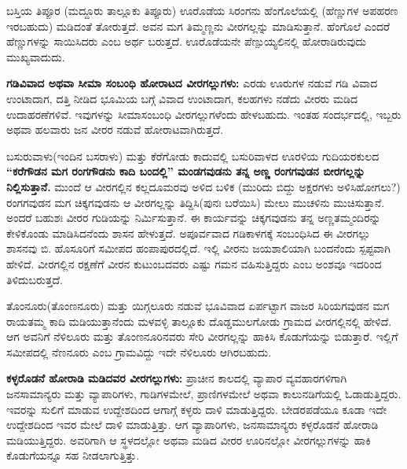 ಬಸ್ತಿಯ ತಿಪ್ಪೂರ (ಮದ್ದೂರು ತಾಲ್ಲೂಕು ತಿಪ್ಪೂರು) ಊರೊಡೆಯ ಸಿರಂಗನು ಹೆಂಗೊಲೆಯಲ್ಲಿ (ಹೆಣ್ಣುಗಳ ಅಪಹರಣ ಇರಬಹುದು) ಮಡಿದಂತೆ ತೋರುತ್ತದೆ. ಅವನ ಮಗ ತಿಮ್ಮಣ್ಣನು ವೀರಗಲ್ಲನ್ನು ಮಾಡಿಸುತ್ತಾನೆ. ಹೆಂಗೊಲೆ ಎಂದರೆ ಹೆಣ್ಣುಗಳನ್ನು ಸಾಯಿಸಿದರು ಎಂಬ ಅರ್ಥ ಬರುತ್ತದೆ. ಊರೊಡೆಯನೇ ಪೆಣ್ಪುಯ್ಯಲಿನಲ್ಲಿ ಹೋರಾಡಿರುವುದು ಮುಖ್ಯವಾದುದು.

\textbf{ಗಡಿವಿವಾದ ಅಥವಾ ಸೀಮಾ ಸಂಬಂಧಿ ಹೋರಾಟದ ವೀರಗಲ್ಲುಗಳು: }ಎರಡು ಊರುಗಳ ನಡುವೆ ಗಡಿ ವಿವಾದ ಉಂಟಾದಾಗ, ದತ್ತಿ ನೀಡಿದ ಭೂಮಿಯ ಬಗ್ಗೆ ವಿವಾದ ಉಂಟಾದಾಗ, ಕಲಹಗಳು ನಡೆದು ವೀರರು ಮಡಿದ ಉದಾಹರಣೆಗಳಿವೆ. ಇವುಗಳನ್ನು ಸೀಮಾಸಂಬಂಧಿ ವೀರಗಲ್ಲುಗಳೆಂದು ಹೇಳಬಹುದು. ಇಂತಹ ಸಂದರ್ಭದಲ್ಲಿ, ಇಬ್ಬರು ಅಥವಾ ಹಲವಾರು ಜನ ವೀರರ ನಡುವೆ ಹೋರಾಟವಾಗಿರುತ್ತದೆ.

ಬಸುರುವಾಳು(ಇಂದಿನ ಬಸರಾಳು) ಮತ್ತು ಕೆರೆಗೋಡು ಕಾದುವಲ್ಲಿ ಬಸುರಿವಾಳದ ಊರಳಿಯ ಗುದಿಯರಕುಲದ \textbf{“ಕರೆಗೌಡನ ಮಗ ರಂಗಗೌಡನು ಕಾದಿ ಬಂದಲ್ಲಿ” ಮಂಡಗವುಡನು ತನ್ನ ಅಣ್ಣ ರಂಗಗವುಡನ ಬೀರಗಲ್ಲನ್ನು ನಿಲ್ಲಿಸುತ್ತಾನೆ.} ಮುಂದೆ ಆ ವೀರಗಲ್ಲಿನ ಕಲ್ಲದೂಮರವು ಅಳಿದ ಬಳಿಕ (ಮುರಿದು ಬಿದ್ದು ಅಕ್ಷರಗಳು ಅಳಿಸಿಹೋಗಲು?) ರಂಗಗವುಡನ ಮಗ ಚಿಕ್ಕಗವುಡನು ಆ ವೀರಗಲ್ಲನ್ನು ತಿದ್ದಿಸಿ(ಪುನಃ ಬರೆಯಿಸಿ) ಮೇಲು ಮುಚಳಿನು ಮುಚಿಸುತ್ತಾನೆ. ಅಂದರೆ ಬಹುಶಃ ವೀರರ ಗುಡಿಯನ್ನು ನಿರ್ಮಿಸುತ್ತಾನೆ. ಈ ಕಾರ್ಯವನ್ನು ಚಿಕ್ಕಗವುಡನು ತನ್ನ ಅಣ್ಣತಮ್ಮಂದಿರನ್ನು ಕೇಳಿಕೊಂಡು ಮಾಡಿಸಿದನೆಂದು ಶಾಸನ ಹೇಳುತ್ತದೆ. ಅಪೂರ್ವವಾದ ಗಡಿಕಾಳಗಕ್ಕೆ ಸಂಬಂಧಿಸಿದ ಈ ವೀರಗಲ್ಲು ಶಾಸನವು ಬಿ. ಹೊಸೂರಿಗೆ ಸಮೀಪದ ಹಂಪಾಪುರದಲ್ಲಿದೆ. ಇಲ್ಲಿ ವೀರನು ಜಯಶಾಲಿಯಾಗಿ ಬಂದನೆಂದು ಸ್ಪಪ್ಟವಾಗಿ ಹೇಳಿದೆ. ವೀರಗಲ್ಲಿನ ರಕ್ಷಣೆಗೆ ವೀರನ ಕುಟುಂಬದವರು ಎಷ್ಟು ಗಮನ ವಹಿಸುತ್ತಿದ್ದರು ಎಂಬ ಅಂಶವೂ ಇದರಿಂದ ತಿಳಿದುಬರುತ್ತದೆ.

ತೊಂನೂರು(ತೊಂಣನೂರು) ಮತ್ತು ಯಿಗ್ಗಲೂರು ನಡುವೆ ಭೂವಿವಾದ ಏರ್ಪಟ್ಟಾಗ ವಾಜರ ಸಿರಿಯಗವುಡನ ಮಗ ರಾಯತಮ್ಮ ಕಾದಿ ಮಡಿಯುತ್ತಾನೆಂದು ಮಳವಳ್ಳಿ ತಾಲ್ಲೂಕು ದೊಡ್ಡಮುಲಗೋಡು ಗ್ರಾಮದ ವೀರಗಲ್ಲಿನಲ್ಲಿ ಹೇಳಿದೆ. ಆಗ ಅವನಿಗೆ ನೆಳಿಲೂರು ಮತ್ತು ತೊಂಣನೂರಿನವರು ಸೇರಿ ವೀರಗಲ್ಲನ್ನು ಹಾಕಿಸಿ ಕೊಡುಗೆಯನ್ನು ಬಿಡುತ್ತಾರೆ. ಇಲ್ಲಿಗೆ ಸಮೀಪದಲ್ಲಿ ನೆಣನೂರು ಎಂಬ ಗ್ರಾಮವಿದ್ದು ಇದೇ ನೆಳಿಲೂರು ಆಗಿರಬಹುದು.

\textbf{ಕಳ್ಳರೊಡನೆ ಹೋರಾಡಿ ಮಡಿದವರ ವೀರಗಲ್ಲುಗಳು: } ಪ್ರಾಚೀನ ಕಾಲದಲ್ಲಿ ವ್ಯಾಪಾರ ವ್ಯವಹಾರಗಳಿಗಾಗಿ ಜನಸಾಮಾನ್ಯರು ಮತ್ತು ವ್ಯಾಪಾರಿಗಳು, ಗಾಡಿಗಳಮೇಲೆ, ಪ್ರಾಣಿಗಳಮೇಲೆ ಅಥವಾ ಕಾಲುನಡಿಗೆಯಲ್ಲಿ ಓಡಾಡುತ್ತಿದ್ದರು. ಇವರನ್ನು ಸುಲಿಗೆ ಮಾಡುವ ಉದ್ದೇಶದಿಂದ ಆಗಾಗ್ಗೆ ಕಳ್ಳರು ದಾಳಿ ಮಾಡುತ್ತಿದ್ದರು. ಬೇಡರಪಡೆಯೂ ಕೂಡಾ ಇದೇ ಉದ್ದೇಶದಿಂದ ಇವರ ಮೇಲೆ ದಾಳಿ ಮಾಡುತ್ತಿತ್ತು. ಆಗ ವ್ಯಾಪಾರಿಗಳು, ಜನಸಾಮಾನ್ಯರು ಕಳ್ಳರೊಡನೆ ಹೋರಾಡಿ ಮಡಿಯುತ್ತಿದ್ದರು. ಅವರಿಗಾಗಿ ಆ ಸ್ಥಳದಲ್ಲೋ ಅಥವಾ ಮಡಿದ ವೀರರ ಊರಿನಲ್ಲೋ ವೀರಗಲ್ಲುಗಳನ್ನು ಹಾಕಿ ಕೊಡುಗೆಯನ್ನೂ ಸಹ ನೀಡಲಾಗುತ್ತಿತ್ತು.


